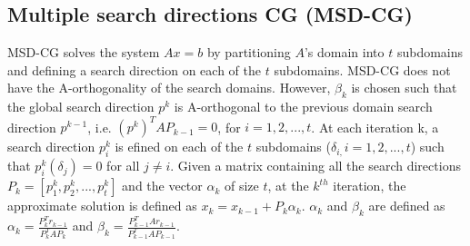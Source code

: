 \documentclass[]{scrartcl}
\begin{document}
\subsection{Multiple search directions CG (MSD-CG)}
MSD-CG solves the system $Ax=b$ by partitioning $A$'s domain into $t$ subdomains and defining a search direction on each of the $t$ subdomains. MSD-CG does not have the A-orthogonality of the search domains. However, $\beta_{k}$ is chosen such that the global search direction $p^{k}$ is A-orthogonal to the previous domain search direction $p^{k-1}$, i.e. $(p^{k})^{T}AP_{k-1}=0$, for $i=1,2, ...,t$. At each iteration k, a search direction $p_{i}^{k}$ is efined on each of the $t$ subdomains ($\delta_{i,}i=1, 2, ..., t$) such that $p_{i}^{k}(\delta_{j})=0$ for all $j\neq i$. Given a matrix containing all the search directions $P_{k}=[p_{1}^{k}, p_{2}^{k}, ..., p_{t}^{k}]$ and the vector $\alpha_{k}$ of size $t$, at the $k^{th}$ iteration, the approximate solution is defined as $x_{k}=x_{k-1}+P_{k}\alpha_{k}$. $\alpha_{k}$ and $\beta_{k}$ are defined as $\alpha_{k}=\frac{P_{k}^{T}r_{k-1}}{P_{k}^{T}AP_{k}}$ and $\beta_{k}=\frac{P_{k-1}^{T}Ar_{k-1}}{P_{k-1}^{T}AP_{k-1}}$.  
\end{document}
